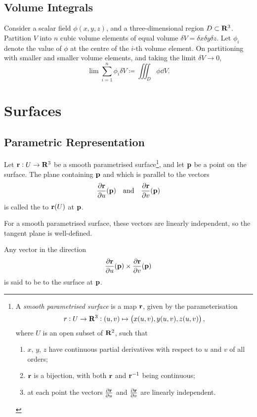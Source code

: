 \subsection{Volume Integrals}
Consider a scalar field $\phi(x,y,z)$, and a three-dimensional region $D\subset\mathbf R^3$. Partition $V$ into $n$ cubic volume elements of equal volume $\delta V=\delta x\delta y\delta z$. Let $\phi_i$ denote the value of $\phi$ at the centre of the $i$-th volume element. On partitioning with smaller and smaller volume elements, and taking the limit $\delta V\to0$,
\[\lim\sum_{i=1}^{n}\phi_i\delta V\coloneqq\iiint_{D}\phi\dd{V}.\]

\section{Surfaces}
\subsection{Parametric Representation}
\begin{definition}
Let $\vb{r}:U\to\mathbf R^3$ be a smooth parametrised surface\footnote{A \emph{smooth parametrised surface} is a map $\vb{r}$, given by the parameterisation \[r:U\to\mathbf R^3:(u,v)\mapsto\left(x(u,v),y(u,v),z(u,v)\right),\] where $U$ is an open subset of $\mathbf R^2$, such that
\begin{enumerate}[label=(\roman*)]
\item $x$, $y$, $z$ have continuous partial derivatives with respect to $u$ and $v$ of all orders;
\item $\vb{r}$ is a bijection, with both $\vb{r}$ and $\vb{r}^{-1}$ being continuous;
\item at each point the vectors $\pdv{\vb{r}}{u}$ and $\pdv{\vb{r}}{v}$ are linearly independent.
\end{enumerate}
}, and let $\vb{p}$ be a point on the surface. The plane containing $\vb{p}$ and which is parallel to the vectors
\[\pdv{\vb{r}}{u}(\vb{p})\quad\text{and}\quad\pdv{\vb{r}}{v}(\vb{p})\]
is called the  to $\vb{r}(U)$ at $\vb{p}$.
\end{definition}

\begin{remark}
For a smooth parametrised surface, these vectors are linearly independent, so the tangent plane is well-defined.
\end{remark}

\begin{definition}
Any vector in the direction
\[\pdv{\vb{r}}{u}(\vb{p})\times\pdv{\vb{r}}{v}(\vb{p})\]
is said to be  to the surface at $\vb{p}$.
\end{definition}


